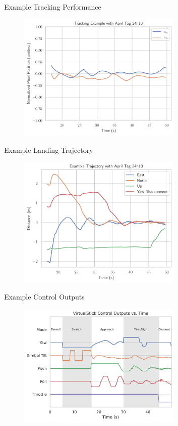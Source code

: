 \documentclass[aspectratio=169]{beamer}
\begin{document}
\begin{frame}{Example Tracking Performance}
	\begin{figure}
		\centering
		\includegraphics[width=0.7\textwidth]{./images/tracking_example}
	\end{figure}
\end{frame}

\begin{frame}{Example Landing Trajectory}
	\begin{figure}
		\centering
		\includegraphics[width=0.7\textwidth]{./images/landing_trajectory}
	\end{figure}
\end{frame}

\begin{frame}{Example Control Outputs}
	\begin{figure}
		\centering
		\includegraphics[width=0.7\textwidth]{./images/control_example}
	\end{figure}
\end{frame}
\end{document}
